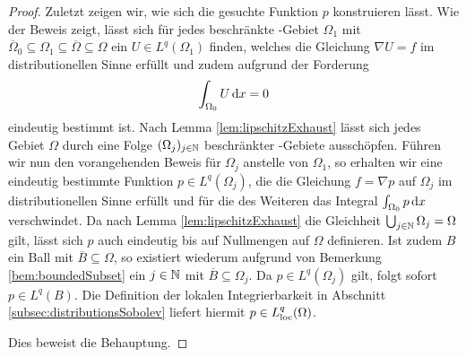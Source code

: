\begin{proof}
  Zuletzt zeigen wir, wie sich die gesuchte Funktion $p$ konstruieren lässt.
  Wie der Beweis zeigt, lässt sich für jedes beschränkte \lipschitz\hyp{}Gebiet $\Omega_1$ mit $\overline\Omega_0 \subseteq \Omega_1 \subseteq \overline\Omega \subseteq \Omega$ ein $U \in L^q(\Omega_1)$ finden, welches die Gleichung $\nabla U = f$ im distributionellen Sinne erfüllt und zudem aufgrund der Forderung 
  $$
  \int_{\Omega_0} U \, {\operatorname{d}\!{x}} = 0
  $$
  eindeutig bestimmt ist.
  Nach Lemma \ref{lem:lipschitzExhaust} lässt sich jedes Gebiet $\Omega$ durch eine Folge $(\Omega_j)_{j \in \mathbb{N}}$ beschränkter \lipschitz\hyp{}Gebiete ausschöpfen.
  Führen wir nun den vorangehenden Beweis für $\Omega_j$ anstelle von $\Omega_1$, so erhalten wir eine eindeutig bestimmte Funktion $p \in L^q(\Omega_j)$, die die Gleichung $f = \nabla p$ auf $\Omega_j$ im distributionellen Sinne erfüllt und für die des Weiteren das Integral $\int_{\Omega_0} p \, {\operatorname{d}\!{x}}$ verschwindet.
  Da nach Lemma \ref{lem:lipschitzExhaust} die Gleichheit $\bigcup_{j \in \mathbb{N}} \Omega_j = \Omega$ gilt, lässt sich $p$ auch eindeutig bis auf Nullmengen auf $\Omega$ definieren.
  Ist zudem $B$ ein Ball mit $\overline B \subseteq \Omega$, so existiert wiederum aufgrund von Bemerkung \ref{bem:boundedSubset} ein $j \in \mathbb{N}$ mit $\overline B \subseteq \Omega_j$.
  Da $p \in L^q(\Omega_j)$ gilt, folgt sofort $p \in L^q(B)$.
  Die Definition der lokalen Integrierbarkeit in Abschnitt \ref{subsec:distributionsSobolev} liefert hiermit $p \in L^q_{\operatorname{loc}}(\Omega)$.

  Dies beweist die Behauptung.
\end{proof}

